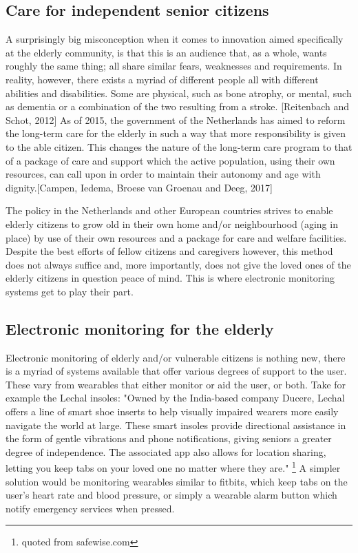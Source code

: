 \documentclass{below-ext}
\begin{document}
\subsection{Care for independent senior citizens}

A surprisingly big misconception when it comes to innovation aimed specifically at the elderly community, is that this is an audience that, as a whole, wants roughly the same thing; all share similar fears, weaknesses and requirements. In reality, however, there exists a myriad of different people all with different abilities and disabilities. Some are physical, such as bone atrophy, or mental, such as dementia or a combination of the two resulting from a stroke. [Reitenbach and Schot, 2012]  As of 2015, the government of the Netherlands has aimed to reform the long-term care for the elderly in such a way that more responsibility is given to the able citizen. This changes the nature of the long-term care program to that of a package of care and support which the active population, using their own resources, can call upon in order to maintain their autonomy and age with dignity.[Campen, Iedema, Broese van Groenau and Deeg, 2017]

The policy in the Netherlands and other European countries strives to enable elderly citizens to grow old in their own home and/or neighbourhood (aging in place) by use of their own resources and a package for care and welfare facilities. \cite{thomas_blanchard} Despite the best efforts of fellow citizens and caregivers however, this method does not always suffice and, more importantly, does not give the loved ones of the elderly citizens in question peace of mind. This is where electronic monitoring systems get to play their part.


\subsection{Electronic monitoring for the elderly}
Electronic monitoring of elderly and/or vulnerable citizens is nothing new, there is a myriad of systems available that offer various degrees of support to the user. These vary from wearables that either monitor or aid the user, or both. Take for example the Lechal insoles: "Owned by the India-based company Ducere, Lechal offers a line of smart shoe inserts to help visually impaired wearers more easily navigate the world at large. These smart insoles provide directional assistance in the form of gentle vibrations and phone notifications, giving seniors a greater degree of independence. The associated app also allows for location sharing, letting you keep tabs on your loved one no matter where they are." \footnote{quoted from safewise.com} A simpler solution would be monitoring wearables similar to fitbits, which keep tabs on the user's heart rate and blood pressure, or simply a wearable alarm button which notify emergency services when pressed.
\end{document}

